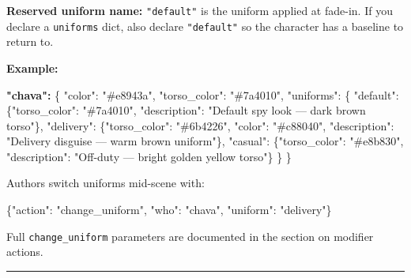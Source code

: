 \documentclass[
  12pt,
  letterpaper,
]{book}
\newenvironment{Shaded}{}{}
\newcommand{\DataTypeTok}[1]{\textcolor[rgb]{0.56,0.13,0.00}{#1}}
\newcommand{\ErrorTok}[1]{\textcolor[rgb]{1.00,0.00,0.00}{\textbf{#1}}}
\newcommand{\FunctionTok}[1]{\textcolor[rgb]{0.02,0.16,0.49}{#1}}
\newcommand{\StringTok}[1]{\textcolor[rgb]{0.25,0.44,0.63}{#1}}
\begin{document}
\textbf{Reserved uniform name:} \texttt{"default"} is the uniform
applied at fade-in. If you declare a \texttt{uniforms} dict, also
declare \texttt{"default"} so the character has a baseline to return to.

\textbf{Example:}

\begin{Shaded}
\begin{Highlighting}[]
\ErrorTok{"chava":} \FunctionTok{\{}
  \DataTypeTok{"color"}\FunctionTok{:} \StringTok{"\#e8943a"}\FunctionTok{,}
  \DataTypeTok{"torso\_color"}\FunctionTok{:} \StringTok{"\#7a4010"}\FunctionTok{,}
  \DataTypeTok{"uniforms"}\FunctionTok{:} \FunctionTok{\{}
    \DataTypeTok{"default"}\FunctionTok{:}  \FunctionTok{\{}\DataTypeTok{"torso\_color"}\FunctionTok{:} \StringTok{"\#7a4010"}\FunctionTok{,}
                 \DataTypeTok{"description"}\FunctionTok{:} \StringTok{"Default spy look — dark brown torso"}\FunctionTok{\},}
    \DataTypeTok{"delivery"}\FunctionTok{:} \FunctionTok{\{}\DataTypeTok{"torso\_color"}\FunctionTok{:} \StringTok{"\#6b4226"}\FunctionTok{,} \DataTypeTok{"color"}\FunctionTok{:} \StringTok{"\#c88040"}\FunctionTok{,}
                 \DataTypeTok{"description"}\FunctionTok{:} \StringTok{"Delivery disguise — warm brown uniform"}\FunctionTok{\},}
    \DataTypeTok{"casual"}\FunctionTok{:}   \FunctionTok{\{}\DataTypeTok{"torso\_color"}\FunctionTok{:} \StringTok{"\#e8b830"}\FunctionTok{,}
                 \DataTypeTok{"description"}\FunctionTok{:} \StringTok{"Off{-}duty — bright golden yellow torso"}\FunctionTok{\}}
  \FunctionTok{\}}
\FunctionTok{\}}
\end{Highlighting}
\end{Shaded}

Authors switch uniforms mid-scene with:

\begin{Shaded}
\begin{Highlighting}[]
\FunctionTok{\{}\DataTypeTok{"action"}\FunctionTok{:} \StringTok{"change\_uniform"}\FunctionTok{,} \DataTypeTok{"who"}\FunctionTok{:} \StringTok{"chava"}\FunctionTok{,} \DataTypeTok{"uniform"}\FunctionTok{:} \StringTok{"delivery"}\FunctionTok{\}}
\end{Highlighting}
\end{Shaded}

Full \texttt{change\_uniform} parameters are documented in the section on
modifier actions.

\begin{center}\rule{0.5\linewidth}{0.5pt}\end{center}
\end{document}
